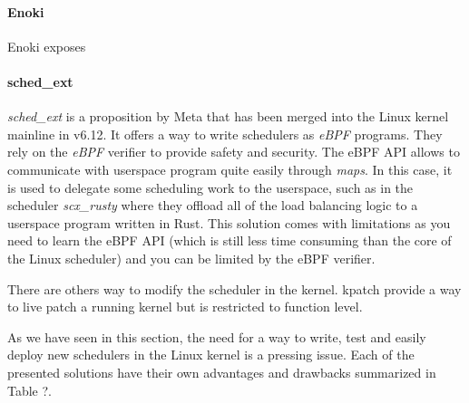 \paragraph{Enoki} Enoki exposes 

\paragraph{sched\_ext}
\par \textit{sched\_ext} is a proposition by Meta that has been merged into the Linux kernel mainline in v6.12. It offers a way to write schedulers as \textit{eBPF} programs. They rely on the \textit{eBPF} verifier to provide safety and security. The eBPF API allows to communicate with userspace program quite easily through \textit{maps}. In this case, it is used to delegate some scheduling work to the userspace, such as in the scheduler \textit{scx\_rusty} where they offload all of the load balancing logic to a userspace program written in Rust. This solution comes with limitations as you need to learn the eBPF API (which is still less time consuming than the core of the Linux scheduler) and you can be limited by the eBPF verifier.\newline

\par There are others way to modify the scheduler in the kernel. kpatch\cite{} provide a way to live patch a running kernel but is restricted to function level. 
\par As we have seen in this section, the need for a way to write, test and easily deploy new schedulers in the Linux kernel is a pressing issue. Each of the presented solutions have their own advantages and drawbacks summarized in Table ?.